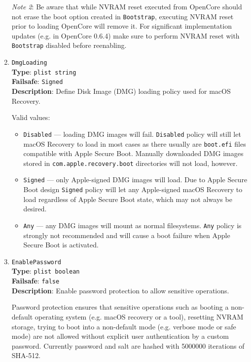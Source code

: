 \documentclass[]{article}
\providecommand{\tightlist}{%
  \setlength{\itemsep}{0pt}\setlength{\parskip}{0pt}}
\begin{document}
\begin{enumerate}
  \emph{Note 2}: Be aware that while NVRAM reset executed from OpenCore should not erase the boot
  option created in \texttt{Bootstrap}, executing NVRAM reset prior to loading OpenCore will remove it. For significant implementation updates (e.g. in OpenCore 0.6.4) make sure to perform
  NVRAM reset with \texttt{Bootstrap} disabled before reenabling.

\item \label{securedmgloading}
  \texttt{DmgLoading}\\
  \textbf{Type}: \texttt{plist\ string}\\
  \textbf{Failsafe}: \texttt{Signed}\\
  \textbf{Description}: Define Disk Image (DMG) loading policy used for macOS Recovery.

  Valid values:

  \begin{itemize}
  \tightlist
  \item \texttt{Disabled} --- loading DMG images will fail. \texttt{Disabled}
    policy will still let macOS Recovery to load in most cases as there
    usually are \texttt{boot.efi} files compatible with Apple Secure Boot.
    Manually downloaded DMG images stored in \texttt{com.apple.recovery.boot}
    directories will not load, however.
  \item \texttt{Signed} --- only Apple-signed DMG images will load. Due to
    Apple Secure Boot design \texttt{Signed} policy will let any Apple-signed
    macOS Recovery to load regardless of Apple Secure Boot state, which may
    not always be desired.
  \item \texttt{Any} --- any DMG images will mount as normal filesystems.
    \texttt{Any} policy is strongly not recommended and will cause a boot failure
    when Apple Secure Boot is activated.
  \end{itemize}

\item
  \texttt{EnablePassword}\\
  \textbf{Type}: \texttt{plist\ boolean}\\
  \textbf{Failsafe}: \texttt{false}\\
  \textbf{Description}: Enable password protection to allow sensitive operations.

  Password protection ensures that sensitive operations such as booting a non-default
  operating system (e.g. macOS recovery or a tool), resetting NVRAM storage,
  trying to boot into a non-default mode (e.g. verbose mode or safe mode) are not
  allowed without explicit user authentication by a custom password. Currently
  password and salt are hashed with 5000000 iterations of SHA-512.


\end{enumerate}
\end{document}

